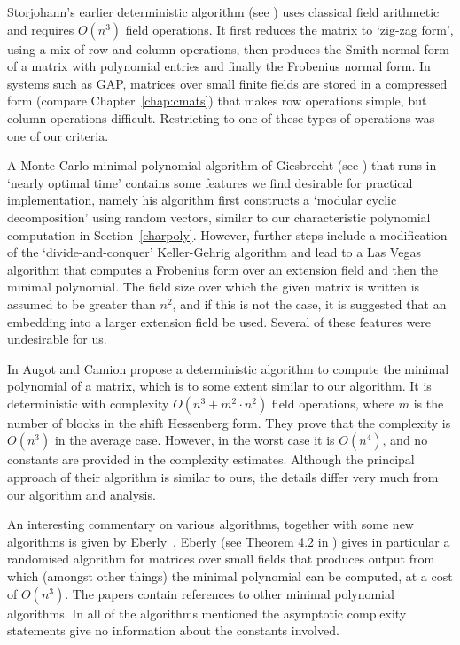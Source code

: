 Storjohann's earlier deterministic algorithm (see \cite{Stor98}) uses classical 
field arithmetic and requires $O(n^3)$ field operations. 
It first reduces the matrix to `zig-zag form', using a mix of row 
and column operations, then produces the Smith normal form 
of a matrix with polynomial entries and finally the Frobenius normal form.
In systems such as {\sf GAP}, matrices over small finite fields 
are stored in a compressed form (compare Chapter~\ref{chap:cmats}) that
makes row operations simple, but column operations difficult.
Restricting to one of these types of operations was one of our criteria.

A Monte Carlo minimal polynomial algorithm of Giesbrecht (see \cite{Gie95}) 
that runs in `nearly optimal time' contains some 
features we find desirable for practical implementation, namely 
his algorithm first constructs a `modular cyclic decomposition' 
using random vectors, similar to our characteristic polynomial 
computation in Section~\ref{charpoly}. However, further steps include a 
modification of the `divide-and-conquer' 
Keller-Gehrig algorithm \cite{KelG85} and lead to a 
Las Vegas algorithm that computes a Frobenius form over an extension 
field and then the minimal polynomial.
The field size over which the given matrix is written is assumed 
to be greater than $n^2$, and if this is not the case, it is 
suggested that an embedding into a larger extension field be used.
Several of these features were undesirable for us.

In \cite[Section 4]{AC97} Augot and Camion propose a deterministic algorithm
to compute the minimal polynomial of a matrix, which is to some extent
similar to our algorithm. It is deterministic with
complexity $O(n^3 + m^2 \cdot n^2)$ field operations, 
where $m$ is the number of blocks
in the shift Hessenberg form. They prove that the complexity is $O(n^3)$ in the
average case. However, in the worst case it is $O(n^4)$, and 
no constants are provided in the complexity estimates. Although the
principal approach of their algorithm is similar to ours, the details
differ very much from our algorithm and analysis.

An interesting commentary on various algorithms, together with some new 
algorithms is given by Eberly~\cite{Eb00}. Eberly (see Theorem 4.2
in \cite{Eb00}) gives in particular a randomised algorithm for matrices 
over small fields that produces output from which (amongst other things)
the minimal polynomial can be computed, at a cost of $O(n^3)$.
The papers \cite{Eb00,Gie95,Steel,Stor98,Stor01} contain references to other 
minimal polynomial algorithms.  In all of the algorithms mentioned 
the asymptotic complexity statements give no information about 
the constants involved. 

